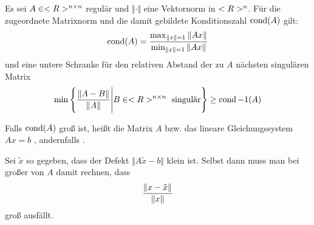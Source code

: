 \begin{proposition}
	Es sei $A\in<R>^{n\times n}$ regulär und $\Vert\cdot\Vert$ eine Vektornorm in $<R>^n$. Für die zugeordnete Matrixnorm und die damit gebildete Konditionszahl $\operatorname{cond}(A)$ gilt:
	\begin{align}
		\operatorname{cond}(A) = \frac{\max_{\Vert x\Vert = 1}\Vert Ax\Vert}{\min_{\Vert x\Vert = 1}\Vert Ax\Vert}\notag
	\end{align}
	und eine untere Schranke für den relativen Abstand der zu $A$ nächsten singulären Matrix
	\begin{align}
		\min\left\lbrace \frac{\Vert A-B\Vert}{\Vert A\Vert} \Bigg| B\in<R>^{n\times n}\text{ singulär}\right\rbrace  \ge \operatorname{cond}{-1}(A)\notag
	\end{align}
\end{proposition}

\begin{remark}
	Falls $\operatorname{cond}(A)$ groß ist, heißt die Matrix $A$ bzw. das lineare Gleichungssystem $Ax=b$ , andernfalls .
\end{remark}

Sei $\tilde{x}$ so gegeben, dass der Defekt $\Vert A\tilde{x}-b\Vert$ klein ist. Selbst dann muss man bei großer von $A$ damit rechnen, dass
\begin{align}
	\frac{\Vert x-\tilde{x}\Vert}{\Vert x\Vert}\notag
\end{align}
groß ausfällt.